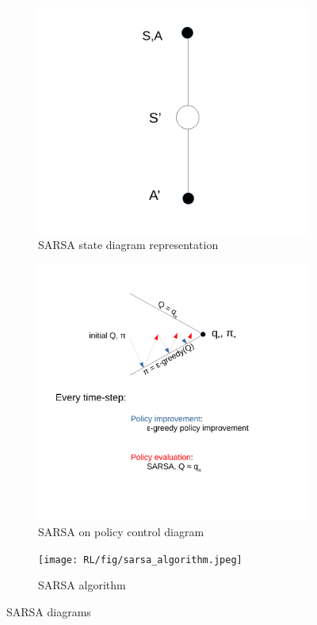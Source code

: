 \begin{figure}[!htb]
	\begin{subfigure}{.5\textwidth}
		\centering
		\includegraphics[width=1\linewidth]{RL/fig/sarsa_state_diagram.pdf}
		\caption{SARSA state diagram representation\cite{David_Silver}}
		\label{fig:sarsa_state_diagram}
	\end{subfigure}
	\begin{subfigure}{.49\textwidth}
		\centering
		\includegraphics[width=1\linewidth]{RL/fig/sarsa_on_policy_control.pdf}
		\caption{SARSA on policy control diagram\cite{David_Silver}}
		\label{fig:sarsa_on_policy}
	\end{subfigure}
	\begin{subfigure}{1\textwidth}
		\centering
		\texttt{[image: RL/fig/sarsa\_algorithm.jpeg]}
		\caption{SARSA algorithm\cite{David_Silver}}
		\label{fig:sarsa_algorithm}
	\end{subfigure}
	\caption{SARSA diagrams \cite{David_Silver}}
	\label{fig:sarsa}	
\end{figure}
